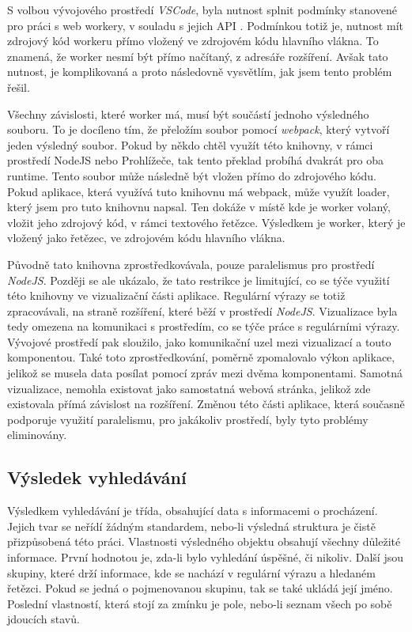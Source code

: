 S volbou vývojového prostředí \textit{VSCode}, byla nutnost splnit podmínky stanovené pro práci s web workery, v souladu s jejich API \cite{Microsoft_2021}. 
Podmínkou totiž je, nutnost mít zdrojový kód workeru přímo vložený ve zdrojovém kódu hlavního vlákna.
To znamená, že worker nesmí být přímo načítaný, z adresáře rozšíření.
Avšak tato nutnost, je komplikovaná a proto následovně vysvětlím, jak jsem tento problém řešil.

Všechny závislosti, které worker má, musí být součástí jednoho výsledného souboru.
To je docíleno tím, že přeložím soubor pomocí \textit{webpack}, který vytvoří jeden výsledný soubor.
Pokud by někdo chtěl využít této knihovny, v rámci prostředí NodeJS nebo Prohlížeče, 
tak tento překlad probíhá dvakrát pro oba runtime.
Tento soubor může následně být vložen přímo do zdrojového kódu.
Pokud aplikace, která využívá tuto knihovnu má webpack, 
může využít loader, který jsem pro tuto knihovnu napsal. 
Ten dokáže v místě kde je worker volaný, vložit jeho zdrojový kód, v rámci textového řetězce.
Výsledkem je worker, který je vložený jako řetězec, ve zdrojovém kódu hlavního vlákna.

Původně tato knihovna zprostředkovávala, pouze paralelismus pro prostředí \textit{NodeJS}.
Později se ale ukázalo, že tato restrikce je limitující, co se týče využití této knihovny ve vizualizační části aplikace.
Regulární výrazy se totiž zpracovávali, na straně rozšíření, které běží v prostředí \textit{NodeJS}.
Vizualizace byla tedy omezena na komunikaci s prostředím, co se týče práce s regulárními výrazy.
Vývojové prostředí pak sloužilo, jako komunikační uzel mezi vizualizací a touto komponentou.
Také toto zprostředkování, poměrně zpomalovalo výkon aplikace, jelikož se musela data posílat pomocí zpráv mezi dvěma komponentami.
Samotná vizualizace, nemohla existovat jako samostatná webová stránka, jelikož zde existovala přímá závislost na rozšíření.
Změnou této části aplikace, která současně podporuje využití paralelismu, pro jakákoliv prostředí, byly tyto problémy eliminovány.

\subsection*{Výsledek vyhledávání}

Výsledkem vyhledávání je třída, obsahující data s informacemi o procházení.
Jejich tvar se neřídí žádným standardem, nebo-li výsledná struktura je čistě přizpůsobená této práci.
Vlastnosti výsledného objektu obsahují všechny důležité informace.
První hodnotou je, zda-li bylo vyhledání úspěšné, či nikoliv. 
Další jsou skupiny, které drží informace, kde se nachází v regulární výrazu a hledaném řetězci. 
Pokud se jedná o pojmenovanou skupinu, tak se také ukládá její jméno. 
Poslední vlastností, která stojí za zmínku je pole, nebo-li seznam všech po sobě jdoucích stavů.

